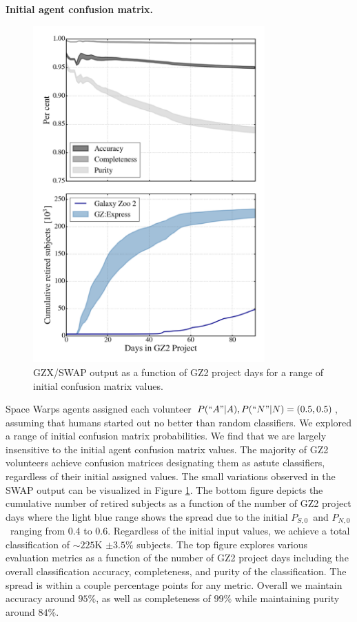 \documentclass[twocolumn]{aastex6}
\newcommand{\Ps}{$P_{S,0}$}
\newcommand{\Pn}{$P_{N,0}$}
\begin{document}
\textbf{Initial agent confusion matrix.} 
\begin{figure}[t!]
\includegraphics[width=3.5in]{figures/GZX_eval_and_retirement_PLPD_spread_4paper.png}
\caption{GZX/SWAP output as a function of GZ2 project days for a range of initial
confusion matrix values.  \label{fig: confusionMatrixAnalysis}}
\end{figure}
Space Warps agents assigned each volunteer $P(``A"|A), P(``N"|N) = (0.5, 0.5)$, 
assuming that humans started out no better than random classifiers.  We explored a range
of initial confusion matrix probabilities. We find that we are largely insensitive to the 
initial agent confusion matrix values.  The majority of GZ2 volunteers achieve confusion
matrices designating them as astute classifiers, regardless of their initial assigned values. 
The  small variations observed in the SWAP output can be visualized in 
Figure \ref{fig: confusionMatrixAnalysis}. The bottom figure depicts the cumulative 
number of retired subjects as a function of the number of GZ2 project days where the light blue range 
shows the spread due to the initial \Ps~and \Pn~ranging from 0.4 to 0.6. 
Regardless of the initial input values, we achieve a total classification of $\sim225$K  $\pm 3.5\%$ subjects. 
The top figure explores various evaluation metrics as a function of the number of 
GZ2 project days including the overall classification accuracy, completeness, and 
purity of the classification. The spread is within a couple percentage points for any
metric. Overall we maintain accuracy around $95\%$, as well as completeness of $99\%$
while maintaining purity around $84\%$. 
\end{document}
